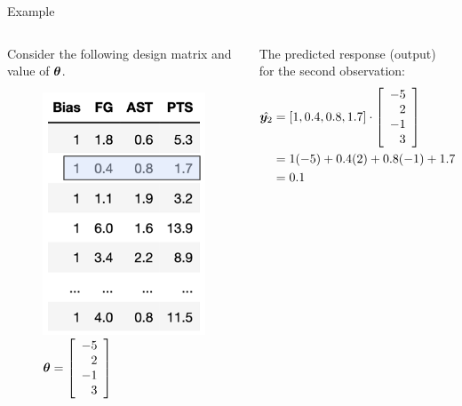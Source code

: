 \documentclass[aspectratio=169]{../latex_main/tntbeamer}  %
\begin{document}
	
	\begin{frame}{Example}
	    \begin{columns}
	        \begin{column}{.4\textwidth}
	              Consider the following design matrix and value of $\bm{\theta}$.
	              \begin{figure}
	                  \includegraphics[scale=.35]{Bild2}
	                   $\bm{\theta} = \left[\begin{array}{r}
	                   -5  \\
	                   2 \\
	                   -1 \\
	                   3
	              \end{array}\right]$
	              \end{figure}
	        \end{column}
	        
	        
	         \begin{column}{.4\textwidth}
	              The predicted response (output) for the second observation:
	                \begin{align*}
	                   \hat{\bm{y}_2} &=[1, 0.4, 0.8 ,1.7] \cdot \left[\begin{array}{r}
	                   -5  \\
	                   2 \\
	                   -1 \\
	                   3
	                   \end{array}\right]\\
	                      &= 1(-5)+0.4(2)+0.8(-1) + 1.7(3)\\
	                      &=0.1
	                 \end{align*}
	                   
	                  
	        \end{column}
	    \end{columns}
	\end{frame}
	
\end{document}
